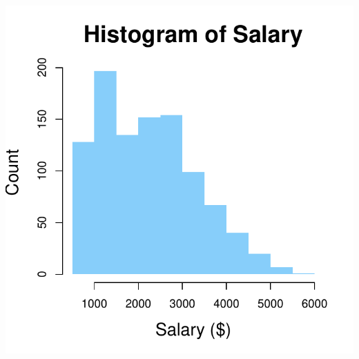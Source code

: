 \documentclass[aspectratio=169]{beamer}
\theoremstyle{principle}
\begin{document}
\begin{frame}
\begin{columns}
\begin{column}{0.5\textwidth}
\includegraphics[scale=0.5]{histogram_10.pdf}
\end{column}

\end{columns}

\end{frame}
\end{document}
